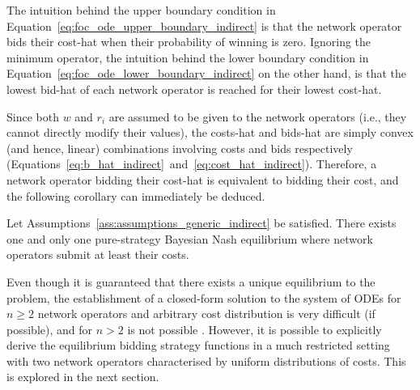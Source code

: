 
The intuition behind the upper boundary condition in Equation~\eqref{eq:foc_ode_upper_boundary_indirect} is that the network operator bids their cost-hat when their probability of winning is zero. Ignoring the minimum operator, the intuition behind the lower boundary condition in Equation~\eqref{eq:foc_ode_lower_boundary_indirect} on the other hand, is that the lowest bid-hat of each network operator is reached for their lowest cost-hat.

Since both $w$ and $r_i$ are assumed to be given to the network operators (i.e., they cannot directly modify their values), the costs-hat and bids-hat are simply convex (and hence, linear) combinations involving costs and bids respectively (Equations~\eqref{eq:b_hat_indirect}~and~\eqref{eq:cost_hat_indirect}). Therefore, a network operator bidding their cost-hat is equivalent to bidding their cost, and the following corollary can immediately be deduced.
\begin{corollary}
\label{cor:characterization_of_the_equilibrium_indirect}
Let Assumptions~\ref{ass:assumptions_generic_indirect} be satisfied. There exists one and only one pure-strategy Bayesian Nash equilibrium where network operators submit at least their costs.
\end{corollary}

Even though it is guaranteed that there exists a unique equilibrium to the problem, the establishment of a closed-form solution to the system of ODEs for $n\ge 2$ network operators and arbitrary cost distribution is very difficult (if possible), and for $n>2$ is not possible \cite{Lebrun2006, Krishna10}. However, it is possible to explicitly derive the equilibrium bidding strategy functions in a much restricted setting with two network operators characterised by uniform distributions of costs. This is explored in the next section.

